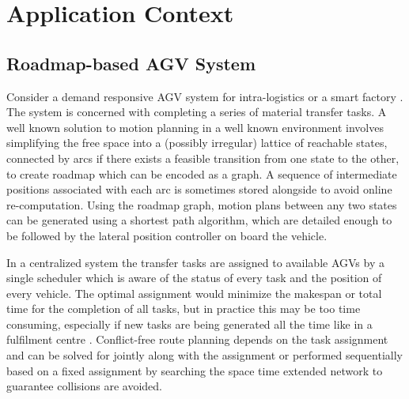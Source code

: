 %

\section{Application Context}
\subsection{Roadmap-based AGV System}
Consider a demand responsive AGV system for intra-logistics \cite{Boysen2019} or a smart factory \cite{Dotoli2019}. The system is concerned with completing a series of material transfer tasks. 
A well known solution to motion planning in a well known environment involves simplifying the free space into a (possibly irregular) lattice of reachable states, connected by arcs if there exists a feasible transition from one state to the other, to create  roadmap which can be encoded as a graph. A sequence of intermediate positions associated with each arc is sometimes stored alongside to avoid online re-computation. Using the roadmap graph, motion plans between any two states can be generated using a shortest path algorithm, which are detailed enough to be followed by the lateral position controller on board the vehicle. 

In a centralized system the transfer tasks are assigned to available AGVs by a single scheduler which is aware of the status of every task and the position of every vehicle. The optimal assignment would minimize the makespan or total time for the completion of all tasks, but in practice this may be too time consuming, especially if new tasks are being generated all the time like in a fulfilment centre \cite{Azadeh2019}. Conflict-free route planning depends on the task assignment and can be solved for jointly along with the assignment or performed sequentially based on a fixed assignment by searching the space time extended network to guarantee collisions are avoided.

